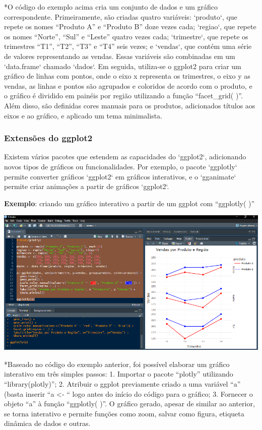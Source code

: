 \documentclass[
]{book}
\begin{document}
*O código do exemplo acima cria um conjunto de dados e um gráfico correspondente. Primeiramente, são criadas quatro variáveis: `produto`, que repete os nomes ``Produto A'' e ``Produto B'' doze vezes cada; `regiao`, que repete os nomes ``Norte'', ``Sul'' e ``Leste'' quatro vezes cada; `trimestre`, que repete os trimestres ``T1'', ``T2'', ``T3'' e ``T4'' seis vezes; e `vendas`, que contém uma série de valores representando as vendas. Essas variáveis são combinadas em um `data.frame` chamado `dados`. Em seguida, utiliza-se o ggplot2 para criar um gráfico de linhas com pontos, onde o eixo x representa os trimestres, o eixo y as vendas, as linhas e pontos são agrupados e coloridos de acordo com o produto, e o gráfico é dividido em painéis por região utilizando a função ``facet\_grid( )''. Além disso, são definidas cores manuais para os produtos, adicionados títulos aos eixos e ao gráfico, e aplicado um tema minimalista.

\subsubsection{Extensões do ggplot2}\label{extensuxf5es-do-ggplot2}

Existem vários pacotes que estendem as capacidades do `ggplot2`, adicionando novos tipos de gráficos ou funcionalidades. Por exemplo, o pacote `ggplotly` permite converter gráficos `ggplot2` em gráficos interativos, e o `gganimate` permite criar animações a partir de gráficos `ggplot2`.

\textbf{Exemplo}: criando um gráfico interativo a partir de um ggplot com ``ggplotly( )''

\includegraphics{images/clipboard-465180566.png}

*Baseado no código do exemplo anterior, foi possível elaborar um gráfico interativo em três simples passos: 1. Importar o pacote ``plotly'' utilizando ``library(plotly)''; 2. Atribuir o ggplot previamente criado a uma variável ``a'' (basta inserir ``a \textless- `` logo antes do início do código para o gráfico; 3. Fornecer o objeto ``a'' à função ``ggplotly( )''. O gráfico gerado, apesar de similar ao anterior, se torna interativo e permite funções como zoom, salvar como figura, etiqueta dinâmica de dados e outras.
\end{document}
